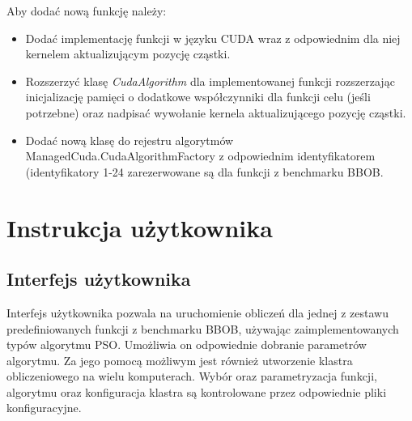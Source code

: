 \documentclass[12pt, twoside, openany, abstract=on]{report}
\theoremstyle{definition}
\begin{document}
Aby dodać nową funkcję należy:
\begin{itemize}
\item Dodać implementację funkcji w języku CUDA wraz z odpowiednim dla niej kernelem aktualizującym pozycję cząstki.
\item Rozszerzyć klasę \textit{CudaAlgorithm} dla implementowanej funkcji rozszerzając inicjalizację pamięci o dodatkowe współczynniki dla funkcji celu (jeśli potrzebne) oraz nadpisać wywołanie kernela aktualizującego pozycję cząstki.
\item Dodać nową klasę do rejestru algorytmów ManagedCuda.CudaAlgorithmFactory z odpowiednim identyfikatorem (identyfikatory 1-24 zarezerwowane są dla funkcji z benchmarku BBOB.
\end{itemize}
 
 
\chapter{Instrukcja użytkownika}

\section{Interfejs użytkownika}
Interfejs użytkownika pozwala na uruchomienie obliczeń dla jednej z zestawu predefiniowanych funkcji z benchmarku BBOB, używając zaimplementowanych typów algorytmu PSO. Umożliwia on odpowiednie dobranie parametrów algorytmu. Za jego pomocą możliwym jest również utworzenie klastra obliczeniowego na wielu komputerach. Wybór oraz parametryzacja funkcji, algorytmu oraz konfiguracja klastra są kontrolowane przez odpowiednie pliki konfiguracyjne. 
\end{document}
